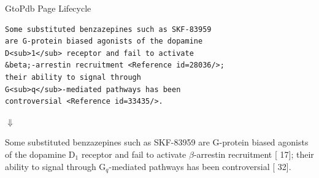 \documentclass[11.5pt, aspectratio=169]{beamer}
\begin{document}
\begin{frame}[fragile]{GtoPdb Page Lifecycle}

  \begin{minipage}{0.3\textwidth}
  \end{minipage}
  \hfill
  \begin{minipage}{0.575\textwidth}
    {\small
      \begin{verbatim}
Some substituted benzazepines such as SKF-83959
are G-protein biased agonists of the dopamine
D<sub>1</sub> receptor and fail to activate
&beta;-arrestin recruitment <Reference id=28036/>;
their ability to signal through
G<sub>q</sub>-mediated pathways has been
controversial <Reference id=33435/>.
\end{verbatim}
  }

  {
    \centering
      \vspace{1em}
    \Huge
      \hfill $\Downarrow$ \hfill
      \vspace{1em}
  }

  {
    \small
Some substituted benzazepines such as SKF-83959
are G-protein biased agonists of the dopamine
D$_1$ receptor and fail to activate
$\beta$-arrestin recruitment [{\color{blue} 17}];
their ability to signal through
G$_q$-mediated pathways has been
controversial [{\color{blue} 32}].
  }
  \end{minipage}


\end{frame}
\end{document}
